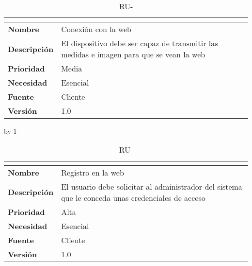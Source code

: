 \begin{table}[H]
	\caption{RU-\number\ru}
	\begin{tabular}{|l|p{}|}
		\hline
		\multicolumn{2}{|c|}{\cellcolor[HTML]{BFBFBF}{\color[HTML]{000000} \textbf{RU-\number\ru}}} \\ \hline
		\textbf{Nombre}      & Conexión con la web                                                                      \\ \hline
		\textbf{Descripción} & El dispositivo debe ser capaz de transmitir las medidas e imagen para que se vean la web \\ \hline
		\textbf{Prioridad}   & Media                                                                                    \\ \hline
		\textbf{Necesidad}   & Esencial                                                                                 \\ \hline
		\textbf{Fuente}      & Cliente                                                                                  \\ \hline
		\textbf{Versión}     & 1.0                                                                                      \\ \hline
	\end{tabular}
\end{table}
\advance\ru by 1
\begin{table}[H]
	\caption{RU-\number\ru}
	\begin{tabular}{|l|p{}|}
		\hline
		\multicolumn{2}{|c|}{\cellcolor[HTML]{BFBFBF}{\color[HTML]{000000} \textbf{RU-\number\ru}}} \\ \hline
		\textbf{Nombre}      & Registro en la web                                                                                \\ \hline
		\textbf{Descripción} & El usuario debe solicitar al administrador del sistema que le conceda unas credenciales de acceso \\ \hline
		\textbf{Prioridad}   & Alta                                                                                              \\ \hline
		\textbf{Necesidad}   & Esencial                                                                                          \\ \hline
		\textbf{Fuente}      & Cliente                                                                                           \\ \hline
		\textbf{Versión}     & 1.0                                                                                               \\ \hline
	\end{tabular}
\end{table}
